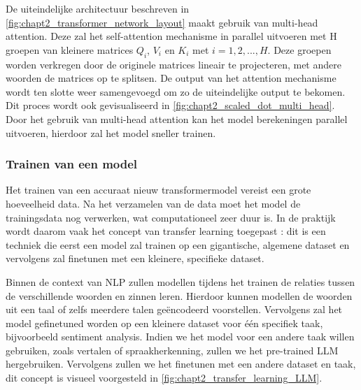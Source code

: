 \fi %

De uiteindelijke architectuur beschreven in \autoref{fig:chapt2_transformer_network_layout} maakt gebruik van multi-head attention. Deze zal het self-attention mechanisme in parallel uitvoeren met H groepen van kleinere matrices $Q_i$, $V_i$ en $K_i$ met $i=1,2,...,H$. Deze groepen worden verkregen door de originele matrices lineair te projecteren, met andere woorden de matrices op te splitsen. De output van het attention mechanisme wordt ten slotte weer samengevoegd om zo de uiteindelijke output te bekomen. Dit proces wordt ook gevisualiseerd in \autoref{fig:chapt2_scaled_dot_multi_head}. Door het gebruik van multi-head attention kan het model berekeningen parallel uitvoeren, hierdoor zal het model sneller trainen.


\subsubsection{Trainen van een model}
Het trainen van een accuraat nieuw transformermodel vereist een grote hoeveelheid data. Na het verzamelen van de data moet het model de trainingsdata nog verwerken, wat computationeel zeer duur is. In de praktijk wordt daarom vaak het concept van transfer learning toegepast \cite{transfer_learning_basic,transformers_datacamp}: dit is een techniek die eerst een model zal trainen op een gigantische, algemene dataset en vervolgens zal finetunen met een kleinere, specifieke dataset. 

Binnen de context van NLP zullen modellen tijdens het trainen de relaties tussen de verschillende woorden en zinnen leren. Hierdoor kunnen modellen de woorden uit een taal of zelfs meerdere talen geëncodeerd voorstellen. Vervolgens zal het model gefinetuned worden op een kleinere dataset voor één specifiek taak, bijvoorbeeld sentiment analysis. Indien we het model voor een andere taak willen gebruiken, zoals vertalen of spraakherkenning, zullen we het pre-trained LLM hergebruiken. Vervolgens zullen we het finetunen met een andere dataset en taak, dit concept is visueel voorgesteld in \autoref{fig:chapt2_transfer_learning_LLM}.

